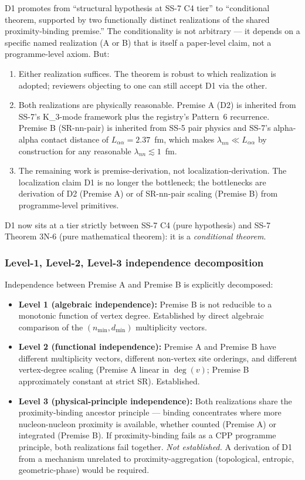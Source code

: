 \documentclass[11pt,letterpaper]{article}
\theoremstyle{definition}
\newcommand{\Kthree}{K_3}
\newcommand{\degv}{\deg(v)}
\begin{document}
D1 promotes from ``structural hypothesis at SS-7 C4 tier'' to ``conditional theorem, supported by two functionally distinct realizations of the shared proximity-binding premise.'' The conditionality is not arbitrary --- it depends on a specific named realization (A or B) that is itself a paper-level claim, not a programme-level axiom. But:

\begin{enumerate}
  \item Either realization suffices. The theorem is robust to which realization is adopted; reviewers objecting to one can still accept D1 via the other.
  \item Both realizations are physically reasonable. Premise A (D2) is inherited from SS-7's \Kthree-mode framework plus the registry's Pattern~6 recurrence. Premise B (SR-nn-pair) is inherited from SS-5 pair physics and SS-7's alpha-alpha contact distance of $L_{\alpha\alpha} = 2.37$~fm, which makes $\lambda_{nn} \ll L_{\alpha\alpha}$ by construction for any reasonable $\lambda_{nn} \lesssim 1$~fm.
  \item The remaining work is premise-derivation, not localization-derivation. The localization claim D1 is no longer the bottleneck; the bottlenecks are derivation of D2 (Premise A) or of SR-nn-pair scaling (Premise B) from programme-level primitives.
\end{enumerate}

D1 now sits at a tier strictly between SS-7 C4 (pure hypothesis) and SS-7 Theorem 3N-6 (pure mathematical theorem): it is a \emph{conditional theorem}.

\subsubsection{Level-1, Level-2, Level-3 independence decomposition}
\label{sec:level-3-gap}

Independence between Premise A and Premise B is explicitly decomposed:

\begin{itemize}
  \item \textbf{Level 1 (algebraic independence):} Premise B is not reducible to a monotonic function of vertex degree. Established by direct algebraic comparison of the $(n_{\min}, d_{\min})$ multiplicity vectors.
  \item \textbf{Level 2 (functional independence):} Premise A and Premise B have different multiplicity vectors, different non-vertex site orderings, and different vertex-degree scaling (Premise A linear in $\degv$; Premise B approximately constant at strict SR). Established.
  \item \textbf{Level 3 (physical-principle independence):} Both realizations share the proximity-binding ancestor principle --- binding concentrates where more nucleon-nucleon proximity is available, whether counted (Premise A) or integrated (Premise B). If proximity-binding fails as a CPP programme principle, both realizations fail together. \emph{Not established.} A derivation of D1 from a mechanism unrelated to proximity-aggregation (topological, entropic, geometric-phase) would be required.
\end{itemize}
\end{document}
